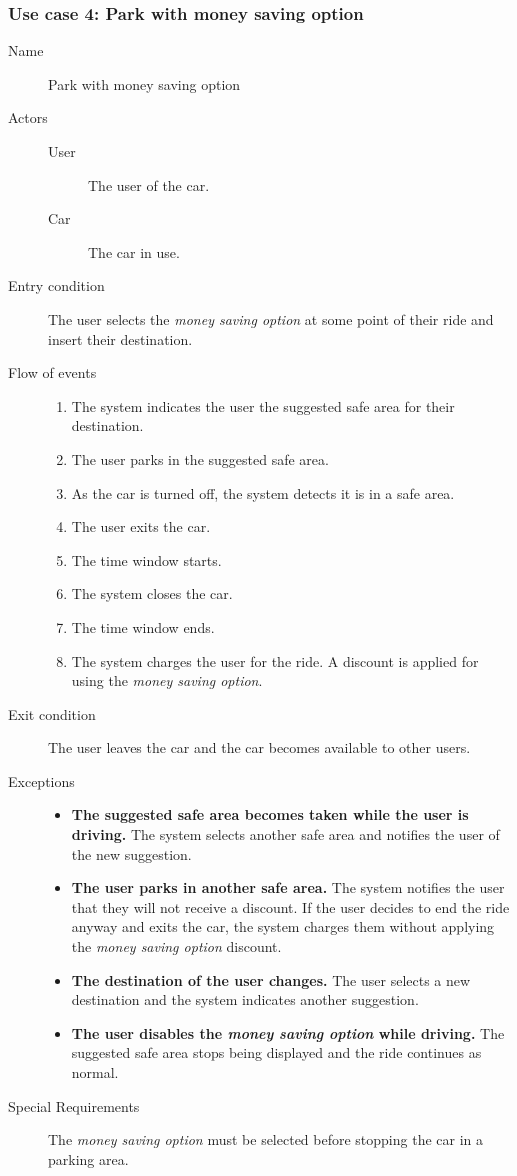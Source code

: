 	\subsubsection{Use case 4: Park with money saving option}
		\begin{description}
			\item[Name] Park with money saving option
			\item[Actors] \hfill
			\begin{description}
				\item[User] The user of the car.
				\item[Car] The car in use.
			\end{description}
			\item[Entry condition] The user selects the \textit{money saving option} at some point of their ride and insert their destination.
			\item[Flow of events] \hfill
			\begin{enumerate}
				\item The system indicates the user the suggested safe area for their destination.
				\item The user parks in the suggested safe area.
				\item As the car is turned off, the system detects it is in a safe area.
				\item The user exits the car.
				\item The time window starts.
				\item The system closes the car.
				\item The time window ends.
				\item The system charges the user for the ride. A discount is applied for using the \textit{money saving option}.
			\end{enumerate}
			\item[Exit condition] The user leaves the car and the car becomes available to other users.
			\item[Exceptions] \hfill
			\begin{itemize}
				\item \textbf{The suggested safe area becomes taken while the user is driving.} The system selects another safe area and notifies the user of the new suggestion.
				\item \textbf{The user parks in another safe area.} The system notifies the user that they will not receive a discount. If the user decides to end the ride anyway and exits the car, the system charges them without applying the \textit{money saving option} discount.
				\item \textbf{The destination of the user changes.} The user selects a new destination and the system indicates another suggestion.
				\item \textbf{The user disables the \textit{money saving option} while driving.} The suggested safe area stops being displayed and the ride continues as normal.
			\end{itemize}
			\item[Special Requirements] The \textit{money saving option} must be selected before stopping the car in a parking area.
		\end{description}

